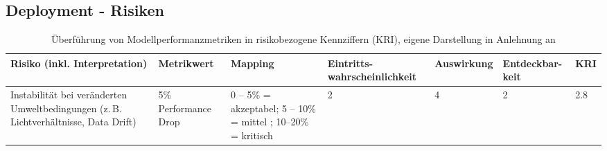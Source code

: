 \begin{landscape}
    \subsection{Deployment - Risiken} 
    \label{appendix:cs3_phase4_risiken}
    \begin{table}[H]
        \label{tab:cs3_phase4_kri_mapping}
        \centering
        \renewcommand{\arraystretch}{1.3}
        \begin{tabular}{|p{5cm} | p{2.5cm} | p{3cm} | p{3.5cm} | p{3cm} | p{2.5cm} | p{1.5cm} |}
        \hline
        \textbf{Risiko (inkl. Interpretation)} & \textbf{Metrikwert} & \textbf{Mapping} & \textbf{Eintritts-wahrscheinlichkeit} & \textbf{Auswirkung} & \textbf{Entdeckbar-keit} & \textbf{KRI} \\
        \hline

        Instabilität bei veränderten Umweltbedingungen (z.\,B. Lichtverhältnisse, Data Drift)
        & 5\% Performance Drop 
        & 0 -- 5\% = akzeptabel; 5 -- 10\% = mittel ; 10--20\% = kritisch 
        & 2 
        & 4 
        & 2 
        & 2.8 \\

        \hline
        \end{tabular}
        \caption{Überführung von Modellperformanzmetriken in risikobezogene Kennziffern (KRI), eigene Darstellung in Anlehnung an \citep{Bundesministerium_2018}}
        
    \end{table}
\end{landscape}

